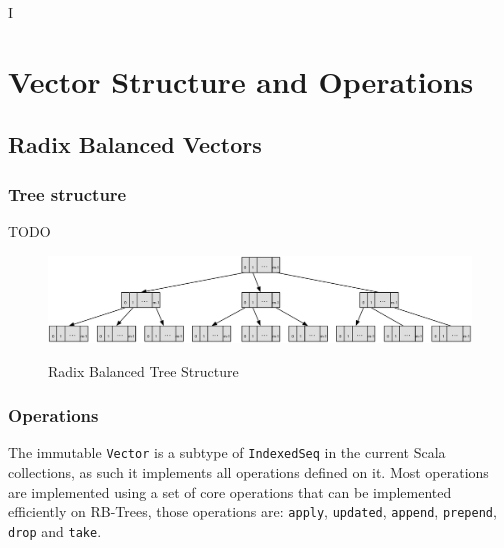 I%

\chapter{Vector Structure and Operations} %

\label{VectorStructure} %



\section{Radix Balanced Vectors}


\subsection{Tree structure}
\color{red} TODO \color{black}

\begin{figure}[h!]
  \centering
  \includegraphics[width=\textwidth]{Figures/Radix_Balanced}
  \label{badix_balanced}
  \caption{Radix Balanced Tree Structure}
\end{figure}



\subsection{Operations}
The immutable \texttt{Vector} \cite{scalaVector211} is a subtype of \texttt{IndexedSeq} in the current Scala collections, as such it implements all operations defined on it. Most operations are implemented using a set of core operations that can be implemented efficiently on RB-Trees, those operations are: \texttt{apply}, \texttt{updated}, \texttt{append}, \texttt{prepend}, \texttt{drop} and \texttt{take}. 

